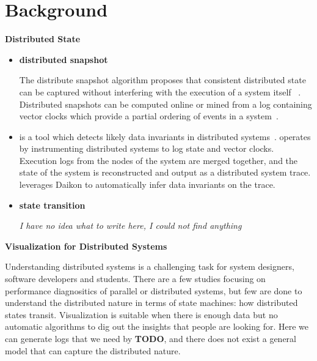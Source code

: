 \section{Background}
\label{sec:background}

\textbf{Distributed State}

\begin{itemize}
    \item \textbf{distributed snapshot}

The distribute snapshot algorithm proposes that consistent distributed state
can be captured without interfering with the execution of a system itself
~\cite{dist_snapshots_Chandy1985}. Distributed snapshots can be computed online
or mined from a log containing vector clocks which provide a partial ordering of events in a system~\cite{mattern_vector_clocks_1989}.

    \item \textbf{\dinv}

\dinv is a tool which detects likely data invariants in distributed
systems~\cite{dinv}. \dinv operates by instrumenting distributed systems to log
state and vector clocks. Execution logs from the nodes of the system are merged
together, and the state of the system is reconstructed and output as a
distributed system trace. \dinv leverages Daikon to automatically infer data
invariants on the trace.

    \item \textbf{state transition}

\textit{I have no idea what to write here, I could not find anything}

\end{itemize}


\textbf{Visualization for Distributed Systems}

Understanding distributed systems is a challenging task for system designers, 
software developers and students.  There are a few studies focusing on 
performance diagnositics of parallel or distributed systems, but few are done
to understand the distributed nature in terms of state machines: 
how distributed states transit.
Visualization is suitable when there is enough data but no automatic algorithms
to dig out the insights that people are looking for.  Here we can generate logs
that we need by \textbf{TODO}, and there does not exist a general model that 
can capture the distributed nature.

